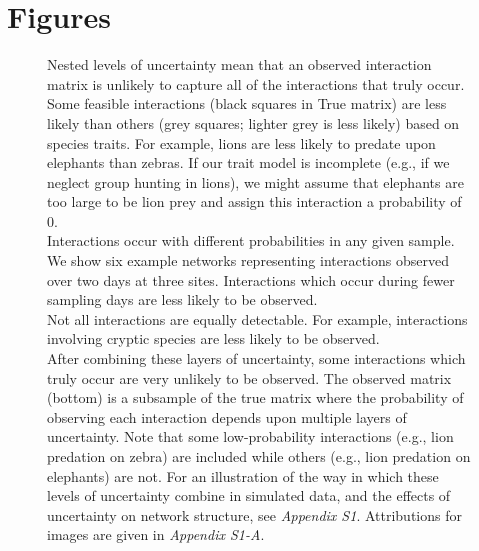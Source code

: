 \documentclass[12pt]{article}
\begin{document}

\section*{Figures}

  \begin{figure}[h!]
    \caption{Nested levels of uncertainty mean that an observed interaction matrix is unlikely to capture all of the interactions that truly occur. Some feasible interactions (black squares in True matrix) are less likely than others (grey squares; lighter grey is less likely) based on species traits. For example, lions are less likely to predate upon elephants than zebras. If our trait model is incomplete (e.g., if we neglect group hunting in lions), we might assume that elephants are too large to be lion prey and assign this interaction a probability of 0.\\
    \indent Interactions occur with different probabilities in any given sample. We show six example networks representing interactions observed over two days at three sites. Interactions which occur during fewer sampling days are less likely to be observed.\\
    \indent Not all interactions are equally detectable. For example, interactions involving cryptic species are less likely to be observed.\\
    \indent After combining these layers of uncertainty, some interactions which truly occur are very unlikely to be observed. The observed matrix (bottom) is a subsample of the true matrix where the probability of observing each interaction depends upon multiple layers of uncertainty. Note that some low-probability interactions (e.g., lion predation on zebra) are included while others (e.g., lion predation on elephants) are not. For an illustration of the way in which these levels of uncertainty combine in simulated data, and the effects of uncertainty on network structure, see \emph{Appendix S1}. Attributions for images are given in \emph{Appendix S1-A}.}
    \label{conceptual_fig}
    \begin{center}

\end{center}
\end{figure}
\end{document}
